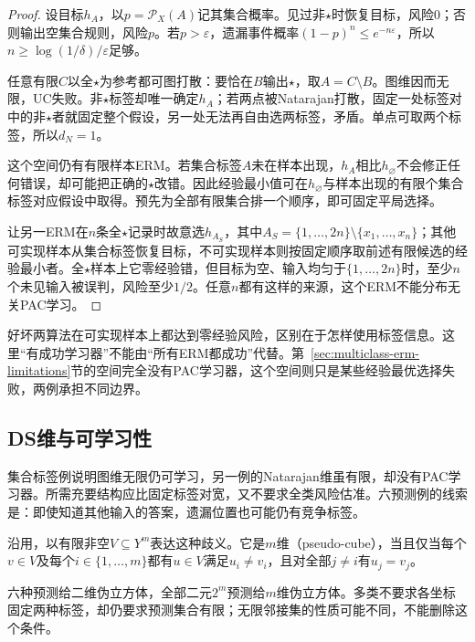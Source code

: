 \begin{proof}
设目标$h_A$，以$p=\mathcal P_X(A)$记其集合概率。见过非$\star$时恢复目标，风险0；否则输出空集合规则，风险$p$。若$p>\varepsilon$，遗漏事件概率$(1-p)^n\leq e^{-n\varepsilon}$，所以$n\geq\log(1/\delta)/\varepsilon$足够。

任意有限$C$以全$\star$为参考都可图打散：要恰在$B$输出$\star$，取$A=C\setminus B$。图维因而无限，UC失败。非$\star$标签却唯一确定$h_A$；若两点被Natarajan打散，固定一处标签对中的非$\star$者就固定整个假设，另一处无法再自由选两标签，矛盾。单点可取两个标签，所以$d_N=1$。

这个空间仍有有限样本ERM。若集合标签$A$未在样本出现，$h_A$相比$h_{\varnothing}$不会修正任何错误，却可能把正确的$\star$改错。因此经验最小值可在$h_{\varnothing}$与样本出现的有限个集合标签对应假设中取得。预先为全部有限集合排一个顺序，即可固定平局选择。

让另一ERM在$n$条全$\star$记录时故意选$h_{A_S}$，其中$A_S=\{1,\ldots,2n\}\setminus\{x_1,\ldots,x_n\}$；其他可实现样本从集合标签恢复目标，不可实现样本则按固定顺序取前述有限候选的经验最小者。全$\star$样本上它零经验错，但目标为空、输入均匀于$\{1,\ldots,2n\}$时，至少$n$个未见输入被误判，风险至少$1/2$。任意$n$都有这样的来源，这个ERM不能分布无关PAC学习。
\end{proof}

好坏两算法在可实现样本上都达到零经验风险，区别在于怎样使用标签信息。这里“有成功学习器”不能由“所有ERM都成功”代替。第~\ref{sec:multiclass-erm-limitations}节的空间完全没有PAC学习器，这个空间则只是某些经验最优选择失败，两例承担不同边界。

\subsection{DS维与可学习性}
\label{sec:ds-dimension}

集合标签例说明图维无限仍可学习，另一例的Natarajan维虽有限，却没有PAC学习器。所需充要结构应比固定标签对宽，又不要求全类风险估准。六预测例的线索是：即使知道其他输入的答案，遗漏位置也可能仍有竞争标签。

沿用，以有限非空$V\subseteq Y^m$表达这种歧义。它是$m$维（pseudo-cube），当且仅当每个$v\in V$及每个$i\in\{1,\ldots,m\}$都有$u\in V$满足$u_i\neq v_i$，且对全部$j\neq i$有$u_j=v_j$。

六种预测给二维伪立方体，全部二元$2^m$预测给$m$维伪立方体。多类不要求各坐标固定两种标签，却仍要求预测集合有限；无限邻接集的性质可能不同，不能删除这个条件。


